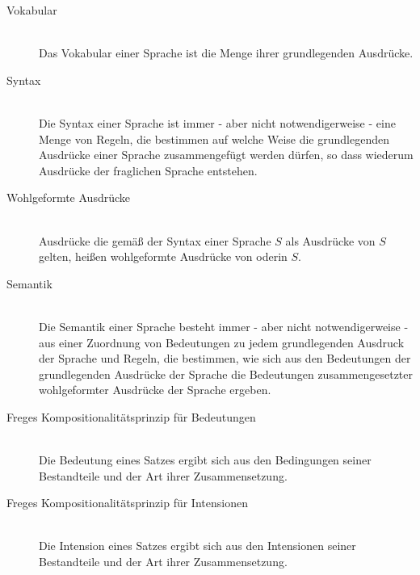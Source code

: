 \documentclass{scrartcl}
\begin{document}
\begin{description}
	\item[Vokabular] \mbox{}\\ Das Vokabular einer Sprache ist die Menge ihrer grundlegenden Ausdrücke.
\end{description}

\begin{description}
	\item[Syntax] \mbox{}\\ Die Syntax einer Sprache ist immer - aber nicht notwendigerweise - eine Menge von Regeln, die bestimmen auf welche Weise die grundlegenden Ausdrücke einer Sprache zusammengefügt werden dürfen, so dass wiederum Ausdrücke der fraglichen Sprache entstehen.
\end{description}

\begin{description}
	\item[Wohlgeformte Ausdrücke] \mbox{}\\ Ausdrücke die gemäß der Syntax einer Sprache $ S $ als Ausdrücke von $ S $ gelten, heißen wohlgeformte Ausdrücke von oderin $ S $.
\end{description}

\begin{description}
	\item[Semantik] \mbox{}\\ Die Semantik einer Sprache besteht immer - aber nicht notwendigerweise - aus einer Zuordnung von Bedeutungen zu jedem grundlegenden Ausdruck der Sprache und Regeln, die bestimmen, wie sich aus den Bedeutungen der grundlegenden Ausdrücke der Sprache die Bedeutungen zusammengesetzter wohlgeformter Ausdrücke der Sprache ergeben.
\end{description}

\begin{description}
	\item[Freges Kompositionalitätsprinzip für Bedeutungen] \mbox{}\\ Die Bedeutung eines Satzes ergibt sich aus den Bedingungen seiner Bestandteile und der Art ihrer Zusammensetzung.
\end{description}

\begin{description}
	\item[Freges Kompositionalitätsprinzip für Intensionen] \mbox{}\\ Die Intension eines Satzes ergibt sich aus den Intensionen seiner Bestandteile und der Art ihrer Zusammensetzung.
\end{description}
\end{document}
